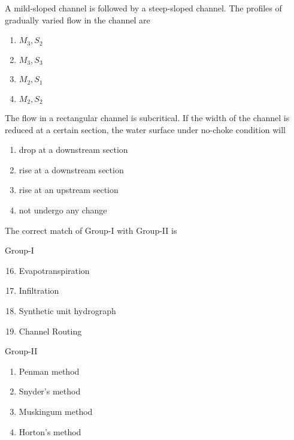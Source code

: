 \item A mild-sloped channel is followed by a steep-sloped channel. The profiles of gradually
varied flow in the channel are  

    \begin{multicols}{4}
        \begin{enumerate}
            \item $M_3, S_2$
            \item $M_3, S_3$
            \item $M_2, S_1$
            \item $M_2, S_2$
        \end{enumerate}
    \end{multicols}

\item The flow in a rectangular channel is subcritical. If the width of the channel is reduced
at a certain section, the water surface under no-choke condition will  

    \begin{multicols}{2}
        \begin{enumerate}
            \item drop at a downstream section
            \item rise at a downstream section
            \item rise at an upstream section
            \item not undergo any change
        \end{enumerate}
    \end{multicols}
    
\item The correct match of Group-I with Group-II is
    \begin{multicols}{2}
        Group-I
        \begin{enumerate}[label={\Alph*.}]
            \setcounter{enumii}{15}
            \item Evapotranspiration
            \item Infiltration
            \item Synthetic unit hydrograph
            \item Channel Routing
        \end{enumerate}
        \columnbreak
        Group-II
        \begin{enumerate}[label={\arabic*.}]
            \item Penman method
            \item Snyder's method
            \item Muskingum method
            \item Horton's method
        \end{enumerate}
    \end{multicols}

